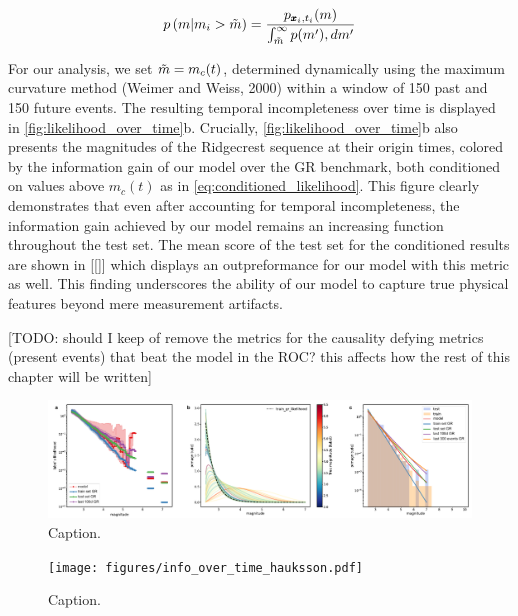 \documentclass[pdflatex]{sn-jnl}
\begin{document}
\begin{equation}
    p \left( m \vert m_i > \Tilde{m} \right) = \frac{p_{\pmb{x}_i, t_i}(m)} {\int_{\Tilde{m}}^{\infty} p(m') ,dm'}
    \label{eq:conditioned_likelihood}
\end{equation}

For our analysis, we set $\Tilde{m} = m_c(t)$, determined dynamically using the maximum curvature method (Weimer and Weiss, 2000) within a window of 150 past and 150 future events. The resulting temporal incompleteness over time is displayed in \ref{fig:likelihood_over_time}b.
Crucially, \ref{fig:likelihood_over_time}b also presents the magnitudes of the Ridgecrest sequence at their origin times, colored by the information gain of our model over the GR benchmark, both conditioned on values above $m_c(t)$ as in \ref{eq:conditioned_likelihood}. This figure clearly demonstrates that even after accounting for temporal incompleteness, the information gain achieved by our model remains an increasing function throughout the test set. The mean score of the test set for the conditioned results are shown in [[]] which displays an outpreformance for our model with this metric as well. This finding underscores the ability of our model to capture true physical features beyond mere measurement artifacts.


[TODO: should I keep of remove the metrics for the causality defying metrics (present events) that beat the model in the ROC? this affects how the rest of this chapter will be written]




\begin{figure}[h!]
    \centering
    \includegraphics[width=1\textwidth]{figures/raw_results_hauksson.pdf}
    \caption{
        Caption.
    }
    \label{fig:architecture}
\end{figure}


\begin{figure}[h!]
    \centering
    \texttt{[image: figures/info\_over\_time\_hauksson.pdf]}
    \caption{
        Caption.
    }
    \label{fig:architecture}
\end{figure}
\end{document}
